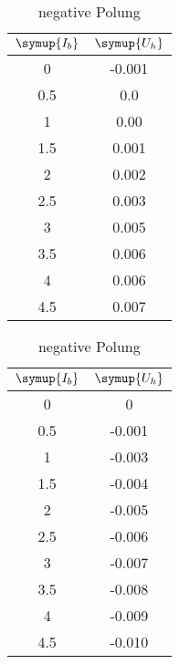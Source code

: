   \begin{table}[!ht]
    \caption*{\textbf{Hallspannung; Strom $\symup{I_q}$ konstant}}
    \begin{minipage}{0.49\textwidth}
          \centering  
          \caption{positive Polung}
          \label{tab:bconst}
          \begin{tabular}{c c}
            \toprule
            $\symup{I_b}$ & $\symup{U_h}$ \\
            \midrule
             0   & -0.001 \\
             0.5 &  0.0 \\
             1   &  0.00 \\
             1.5 &  0.001 \\
             2   &  0.002 \\
             2.5 &  0.003 \\
             3   &  0.005 \\
             3.5 &  0.006 \\
             4   &  0.006 \\
             4.5 &  0.007 \\
            \bottomrule
        \end{tabular}
    \end{minipage}
    \hfill
    \begin{minipage}{0.49\textwidth}
        \centering
          \caption{negative Polung}
          \label{tab:bconst-}
           \begin{tabular}{c c}
            \toprule
            $\symup{I_b}$ & $\symup{U_h}$ \\
            \midrule
              0   &  0 \\
             0.5 & -0.001 \\
            1   & -0.003 \\
            1.5 & -0.004 \\
            2   & -0.005 \\
            2.5 & -0.006 \\
            3   & -0.007 \\
            3.5 & -0.008 \\
            4   & -0.009 \\
            4.5 & -0.010 \\
            \bottomrule
       \end{tabular}
     \end{minipage}
  \end{table}



